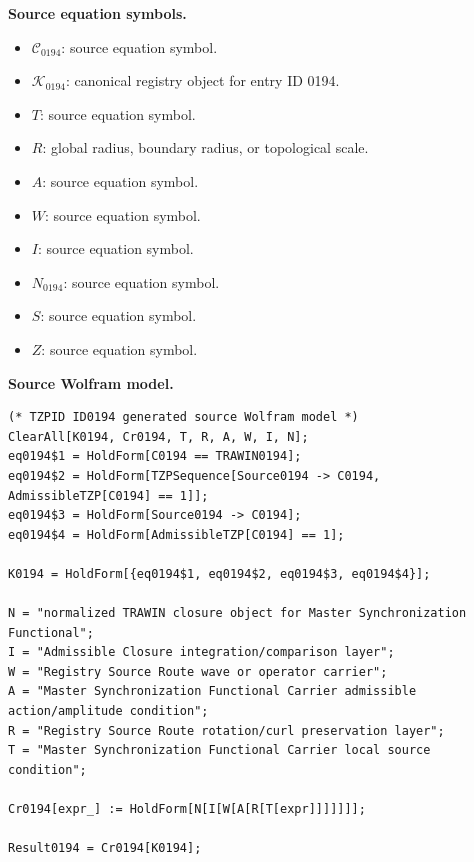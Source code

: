 \begin{minipage}[t]{0.49\linewidth}
\begingroup
\small
\raggedright
\textbf{Source equation symbols.}\par
\begin{itemize}[leftmargin=1.35em,itemsep=1pt,topsep=1pt,parsep=0pt]
    \item $\mathcal{C}_{0194}$: source equation symbol.
    \item $\mathcal{K}_{0194}$: canonical registry object for entry ID 0194.
    \item $T$: source equation symbol.
    \item $R$: global radius, boundary radius, or topological scale.
    \item $A$: source equation symbol.
    \item $W$: source equation symbol.
    \item $I$: source equation symbol.
    \item $N_{0194}$: source equation symbol.
    \item $S$: source equation symbol.
    \item $Z$: source equation symbol.
\end{itemize}
\endgroup
\end{minipage}\hfill
\begin{minipage}[t]{0.47\linewidth}
\begingroup
\scriptsize
\raggedright
\textbf{Source Wolfram model.}\par
\begin{Verbatim}[fontsize=\tiny,breaklines=true,breakanywhere=true]
(* TZPID ID0194 generated source Wolfram model *)
ClearAll[K0194, Cr0194, T, R, A, W, I, N];
eq0194$1 = HoldForm[C0194 == TRAWIN0194];
eq0194$2 = HoldForm[TZPSequence[Source0194 -> C0194, AdmissibleTZP[C0194] == 1]];
eq0194$3 = HoldForm[Source0194 -> C0194];
eq0194$4 = HoldForm[AdmissibleTZP[C0194] == 1];

K0194 = HoldForm[{eq0194$1, eq0194$2, eq0194$3, eq0194$4}];

N = "normalized TRAWIN closure object for Master Synchronization Functional";
I = "Admissible Closure integration/comparison layer";
W = "Registry Source Route wave or operator carrier";
A = "Master Synchronization Functional Carrier admissible action/amplitude condition";
R = "Registry Source Route rotation/curl preservation layer";
T = "Master Synchronization Functional Carrier local source condition";

Cr0194[expr_] := HoldForm[N[I[W[A[R[T[expr]]]]]]];

Result0194 = Cr0194[K0194];
\end{Verbatim}
\endgroup
\end{minipage}

